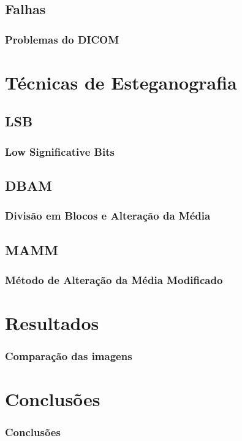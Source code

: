 \documentclass{beamer}
\begin{document}
\subsection{Falhas}
\begin{frame}
\frametitle{Problemas do DICOM}

\end{frame}

\section{Técnicas de Esteganografia}
\subsection{LSB}
\begin{frame}
\frametitle{Low Significative Bits}

\end{frame}
\subsection{DBAM}
\begin{frame}
\frametitle{Divisão em Blocos e Alteração da Média}


\end{frame}

\subsection{MAMM}
\begin{frame}
\frametitle{Método de Alteração da Média Modificado}

\end{frame}

\section{Resultados}
\begin{frame}
\frametitle{Comparação das imagens}

\end{frame}

\section{Conclusões}
\begin{frame}[fragile] %
\frametitle{Conclusões}

\end{frame}
\end{document}
